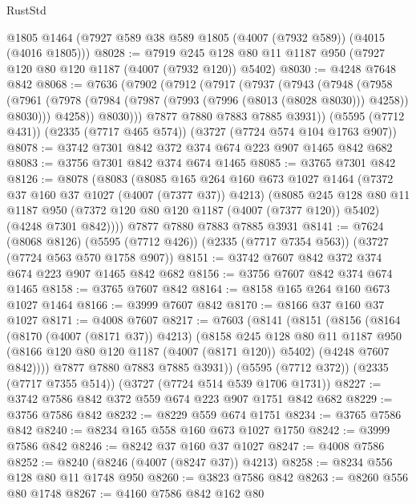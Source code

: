 \begin{lexlean}{RustStd}
\begin{coremodule}
    @1805
    @1464
    (@7927 @589 @38 @589 @1805 (@4007 (@7932 @589)) (@4015 (@4016 @1805)))
@8028 := @7919 @245 @128 @80 @11 @1187 @950 (@7927 @120 @80 @120 @1187 (@4007 (@7932 @120)) @5402)
@8030 := @4248 @7648 @842
@8068 := @7636
    (@7902
      (@7912
        (@7917
          (@7937
            (@7943
              (@7948
                (@7958
                  (@7961 (@7978 (@7984 (@7987 (@7993 (@7996 (@8013 (@8028 @8030))) @4258)) @8030)))
                  @4258))
              @8030)))
        @7877
        @7880
        @7883
        @7885
        @3931))
    (@5595 (@7712 @431))
    (@2335 (@7717 @465 @574))
    (@3727 (@7724 @574 @104 @1763 @907))
@8078 := @3742 @7301 @842 @372 @374 @674 @223 @907 @1465 @842 @682
@8083 := @3756 @7301 @842 @374 @674 @1465
@8085 := @3765 @7301 @842
@8126 := @8078
    (@8083
      (@8085
        @165
        @264
        @160
        @673
        @1027
        @1464
        (@7372 @37 @160 @37 @1027 (@4007 (@7377 @37)) @4213)
        (@8085
          @245
          @128
          @80
          @11
          @1187
          @950
          (@7372 @120 @80 @120 @1187 (@4007 (@7377 @120)) @5402)
          (@4248 @7301 @842))))
    @7877
    @7880
    @7883
    @7885
    @3931
@8141 := @7624
    (@8068 @8126)
    (@5595 (@7712 @426))
    (@2335 (@7717 @7354 @563))
    (@3727 (@7724 @563 @570 @1758 @907))
@8151 := @3742 @7607 @842 @372 @374 @674 @223 @907 @1465 @842 @682
@8156 := @3756 @7607 @842 @374 @674 @1465
@8158 := @3765 @7607 @842
@8164 := @8158 @165 @264 @160 @673 @1027 @1464
@8166 := @3999 @7607 @842
@8170 := @8166 @37 @160 @37 @1027
@8171 := @4008 @7607
@8217 := @7603
    (@8141
      (@8151
        (@8156
          (@8164
            (@8170 (@4007 (@8171 @37)) @4213)
            (@8158
              @245
              @128
              @80
              @11
              @1187
              @950
              (@8166 @120 @80 @120 @1187 (@4007 (@8171 @120)) @5402)
              (@4248 @7607 @842))))
        @7877
        @7880
        @7883
        @7885
        @3931))
    (@5595 (@7712 @372))
    (@2335 (@7717 @7355 @514))
    (@3727 (@7724 @514 @539 @1706 @1731))
@8227 := @3742 @7586 @842 @372 @559 @674 @223 @907 @1751 @842 @682
@8229 := @3756 @7586 @842
@8232 := @8229 @559 @674 @1751
@8234 := @3765 @7586 @842
@8240 := @8234 @165 @558 @160 @673 @1027 @1750
@8242 := @3999 @7586 @842
@8246 := @8242 @37 @160 @37 @1027
@8247 := @4008 @7586
@8252 := @8240 (@8246 (@4007 (@8247 @37)) @4213)
@8258 := @8234 @556 @128 @80 @11 @1748 @950
@8260 := @3823 @7586 @842
@8263 := @8260 @556 @80 @1748
@8267 := @4160 @7586 @842 @162 @80

\end{coremodule}
\end{lexlean}
